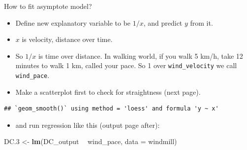 \documentclass[
  ignorenonframetext,
]{beamer}
\newenvironment{Shaded}{\begin{snugshade}}{\end{snugshade}}
\newcommand{\DataTypeTok}[1]{\textcolor[rgb]{0.13,0.29,0.53}{#1}}
\newcommand{\DecValTok}[1]{\textcolor[rgb]{0.00,0.00,0.81}{#1}}
\newcommand{\FloatTok}[1]{\textcolor[rgb]{0.00,0.00,0.81}{#1}}
\newcommand{\KeywordTok}[1]{\textcolor[rgb]{0.13,0.29,0.53}{\textbf{#1}}}
\newcommand{\NormalTok}[1]{#1}
\newcommand{\OperatorTok}[1]{\textcolor[rgb]{0.81,0.36,0.00}{\textbf{#1}}}
\newcommand{\StringTok}[1]{\textcolor[rgb]{0.31,0.60,0.02}{#1}}
\providecommand{\tightlist}{%
  \setlength{\itemsep}{0pt}\setlength{\parskip}{0pt}}
\begin{document}
\begin{frame}[fragile]{How to fit asymptote model?}
\protect\hypertarget{how-to-fit-asymptote-model}{}

\begin{itemize}
\tightlist
\item
  Define new explanatory variable to be \(1/x\), and predict \(y\) from
  it.
\item
  \(x\) is velocity, distance over time.
\item
  So \(1/x\) is time over distance. In walking world, if you walk 5
  km/h, take 12 minutes to walk 1 km, called your pace. So 1 over
  \texttt{wind\_velocity} we call \texttt{wind\_pace}.
\item
  Make a scatterplot first to check for straightness (next page).
\end{itemize}

\begin{Shaded}
\end{Shaded}

\begin{verbatim}
## `geom_smooth()` using method = 'loess' and formula 'y ~ x'
\end{verbatim}

\begin{itemize}
\tightlist
\item
  and run regression like this (output page after):
\end{itemize}

\begin{Shaded}
\begin{Highlighting}[]
\NormalTok{DC}\FloatTok{.3}\NormalTok{ <-}\StringTok{ }\KeywordTok{lm}\NormalTok{(DC_output }\OperatorTok{~}\StringTok{ }\NormalTok{wind_pace, }\DataTypeTok{data =}\NormalTok{ windmill)}
\end{Highlighting}
\end{Shaded}

\end{frame}
\end{document}
